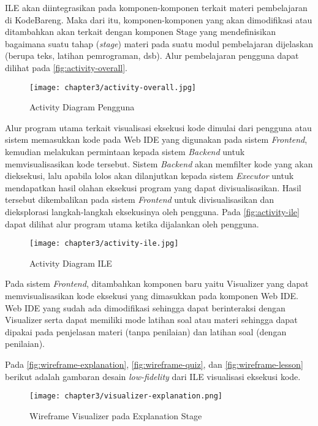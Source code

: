 ILE akan diintegrasikan pada komponen-komponen terkait materi pembelajaran di KodeBareng. Maka dari itu, komponen-komponen yang akan dimodifikasi atau ditambahkan akan terkait dengan komponen Stage yang mendefinisikan bagaimana suatu tahap (\textit{stage}) materi pada suatu modul pembelajaran dijelaskan (berupa teks, latihan pemrograman, dsb). Alur pembelajaran pengguna dapat dilihat pada \autoref{fig:activity-overall}.

\begin{figure}[H]
  \centering
  \texttt{[image: chapter3/activity-overall.jpg]}
  \caption{Activity Diagram Pengguna} \label{fig:activity-overall}
\end{figure}

Alur program utama terkait visualisasi eksekusi kode dimulai dari pengguna atau sistem memasukkan kode pada Web IDE yang digunakan pada sistem \textit{Frontend}, kemudian melakukan permintaan kepada sistem \textit{Backend} untuk memvisualisasikan kode tersebut. Sistem \textit{Backend} akan memfilter kode yang akan dieksekusi, lalu apabila lolos akan dilanjutkan kepada sistem \textit{Executor} untuk mendapatkan hasil olahan eksekusi program yang dapat divisualisasikan. Hasil tersebut dikembalikan pada sistem \textit{Frontend} untuk divisualisasikan dan dieksplorasi langkah-langkah eksekusinya oleh pengguna. Pada \autoref{fig:activity-ile} dapat dilihat alur program utama ketika dijalankan oleh pengguna.

\begin{figure}[H]
  \centering
  \texttt{[image: chapter3/activity-ile.jpg]}
  \caption{Activity Diagram ILE} \label{fig:activity-ile}
\end{figure}

Pada sistem \textit{Frontend}, ditambahkan komponen baru yaitu Visualizer yang dapat memvisualisasikan kode eksekusi yang dimasukkan pada komponen Web IDE. Web IDE yang sudah ada dimodifikasi sehingga dapat berinteraksi dengan Visualizer serta dapat memiliki mode latihan soal atau materi sehingga dapat dipakai pada penjelasan materi (tanpa penilaian) dan latihan soal (dengan penilaian).

Pada \autoref{fig:wireframe-explanation}, \autoref{fig:wireframe-quiz}, dan \autoref{fig:wireframe-lesson} berikut adalah gambaran desain \textit{low-fidelity} dari ILE visualisasi eksekusi kode.

\begin{figure}[H]
  \centering
  \texttt{[image: chapter3/visualizer-explanation.png]}
  \caption{Wireframe Visualizer pada Explanation Stage} \label{fig:wireframe-explanation}
\end{figure}

